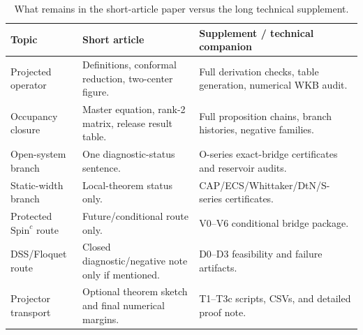 \documentclass[pdflatex,sn-mathphys-num,iicol]{sn-jnl}
\begin{document}
\begin{table}[t]
\centering
\caption{What remains in the short-article paper versus the long technical supplement.}
\label{tab:supplement_map}
\small
\setlength{\tabcolsep}{4pt}
\renewcommand{\arraystretch}{1.12}
\begin{tabular}{@{}l l l@{}}
\toprule
\parbox[t]{0.20\textwidth}{\raggedright \textbf{Topic}} & \parbox[t]{0.34\textwidth}{\raggedright \textbf{Short article}} & \parbox[t]{0.33\textwidth}{\raggedright \textbf{Supplement / technical companion}} \\
\midrule
\parbox[t]{0.20\textwidth}{\raggedright Projected operator} & \parbox[t]{0.34\textwidth}{\raggedright Definitions, conformal reduction, two-center figure.} & \parbox[t]{0.33\textwidth}{\raggedright Full derivation checks, table generation, numerical WKB audit.} \\
\parbox[t]{0.20\textwidth}{\raggedright Occupancy closure} & \parbox[t]{0.34\textwidth}{\raggedright Master equation, rank-2 matrix, release result table.} & \parbox[t]{0.33\textwidth}{\raggedright Full proposition chains, branch histories, negative families.} \\
\parbox[t]{0.20\textwidth}{\raggedright Open-system branch} & \parbox[t]{0.34\textwidth}{\raggedright One diagnostic-status sentence.} & \parbox[t]{0.33\textwidth}{\raggedright O-series exact-bridge certificates and reservoir audits.} \\
\parbox[t]{0.20\textwidth}{\raggedright Static-width branch} & \parbox[t]{0.34\textwidth}{\raggedright Local-theorem status only.} & \parbox[t]{0.33\textwidth}{\raggedright CAP/ECS/Whittaker/DtN/S-series certificates.} \\
\parbox[t]{0.20\textwidth}{\raggedright Protected \(\mathrm{Spin}^c\) route} & \parbox[t]{0.34\textwidth}{\raggedright Future/conditional route only.} & \parbox[t]{0.33\textwidth}{\raggedright V0--V6 conditional bridge package.} \\
\parbox[t]{0.20\textwidth}{\raggedright DSS/Floquet route} & \parbox[t]{0.34\textwidth}{\raggedright Closed diagnostic/negative note only if mentioned.} & \parbox[t]{0.33\textwidth}{\raggedright D0--D3 feasibility and failure artifacts.} \\
\parbox[t]{0.20\textwidth}{\raggedright Projector transport} & \parbox[t]{0.34\textwidth}{\raggedright Optional theorem sketch and final numerical margins.} & \parbox[t]{0.33\textwidth}{\raggedright T1--T3c scripts, CSVs, and detailed proof note.} \\
\bottomrule
\end{tabular}
\end{table}
\end{document}
